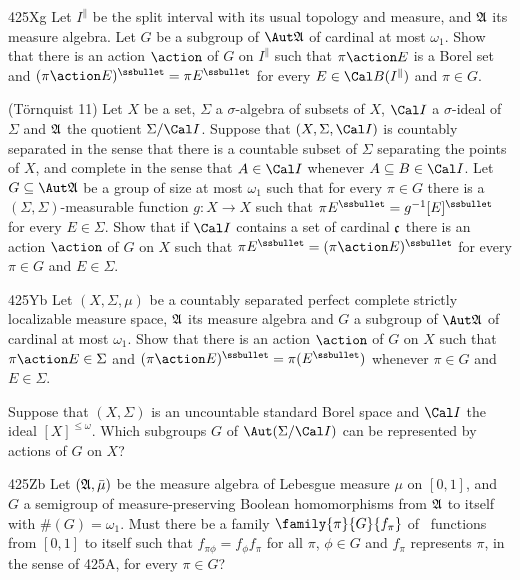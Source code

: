 {\spheader 425Xg Let $I^{\|}$ be the split interval with its usual topology
and measure, and $\frak A$ its measure algebra.   Let $G$ be a subgroup of
$\Aut\frak A$ of cardinal at most $\omega_1$.   Show that there is
an action $\action$ of $G$ on $I^{\|}$ such that
$\pi\action E$ is a Borel set and
$(\pi\action E)^{\ssbullet}=\pi E^{\ssbullet}$
for every $E\in\Cal B(I^{\|})$ and $\pi\in G$.

({\smc T\"ornquist 11}) Let $X$ be a set,
$\Sigma$ a $\sigma$-algebra of subsets of $X$, $\Cal I$ a $\sigma$-ideal of
$\Sigma$ and $\frak A$ the quotient $\Sigma/\Cal I$.   Suppose that
$(X,\Sigma,\Cal I)$ is countably separated in the sense that there is a
countable subset of $\Sigma$ separating the points of $X$, and complete in
the sense that $A\in\Cal I$ whenever $A\subseteq B\in\Cal I$.
Let $G\subseteq\Aut\frak A$ be a group of size
at most $\omega_1$ such that for every $\pi\in G$ there is a
$(\Sigma,\Sigma)$-measurable function $g:X\to X$ such that
$\pi E^{\ssbullet}=g^{-1}[E]^{\ssbullet}$ for every $E\in\Sigma$.
Show that if $\Cal I$ contains a set of cardinal $\frak c$
there is an action $\action$ of $G$ on $X$ such that
$\pi E^{\ssbullet}=(\pi\action E)^{\ssbullet}$ for every $\pi\in G$ and
$E\in\Sigma$.

\spheader 425Yb
Let $(X,\Sigma,\mu)$ be a countably separated
perfect complete strictly localizable measure space,
$\frak A$ its measure algebra and $G$ a subgroup of $\Aut\frak A$ of
cardinal at most $\omega_1$.   Show that there is an action
$\action$ of $G$ on $X$ such that
$\pi\action E\in\Sigma$ and
$(\pi\action E)^{\ssbullet}=\pi(E^{\ssbullet})$ whenever
$\pi\in G$ and $E\in\Sigma$.

}%

Suppose that $(X,\Sigma)$ is an uncountable
standard Borel space and $\Cal I$ the ideal $[X]^{\le\omega}$.   Which subgroups $G$ of $\Aut(\Sigma/\Cal I)$ can be
represented by actions of $G$ on $X$?

\spheader 425Zb Let $(\frak A,\bar\mu)$ be the measure algebra of Lebesgue
measure $\mu$ on $[0,1]$, and $G$ a semigroup of measure-preserving Boolean
homomorphisms from $\frak A$ to itself with $\#(G)=\omega_1$.
Must there be a family $\family{\pi}{G}{f_{\pi}}$ of \imp\ functions from
$[0,1]$ to itself such that $f_{\pi\phi}=f_{\phi}f_{\pi}$ for all $\pi$,
$\phi\in G$ and $f_{\pi}$ represents $\pi$, in the sense
of 425A, for every $\pi\in G$?   

